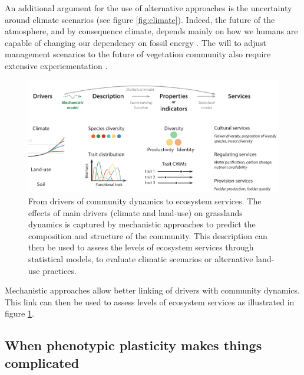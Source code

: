  An additional argument for the use of alternative approaches is the uncertainty around climate scenarios (see figure \ref{fig:climate}). Indeed, the future of the atmosphere, and by consequence climate, depends mainly on how we humans are capable of changing our dependency on fossil energy \parencite{intergovernmental_panel_on_climate_change_climate_2014}. The will to adjust management scenarios to the future of vegetation community \parencite{schirpe_multiple_2013} also require extensive experiementation \parencite{rodriguez_lingra-cc:_1999, martin_simulations_2012, deleglise_drought-induced_2015}.
 
 
 
\begin{figure}
    \includegraphics[width=1\linewidth]{./1_Introduction/graphics/drivers_to_services.pdf}
  \caption[From drivers to ecosystem services]{From drivers of community dynamics to ecosystem services. The effects of main drivers (climate and land-use) on grasslands dynamics is captured by mechanistic approaches to predict the composition and structure of the community. This description can then be used to assess the levels of ecosystem services through statistical models, to evaluate climatic scenarios or alternative land-use practices.}
  \label{fig:drivers2services}
\end{figure}

Mechanistic approaches allow better linking of drivers with community dynamics. This link can then be used to assess levels of ecosystem services as illustrated in figure \ref{fig:drivers2services}.




\subsection{When phenotypic plasticity makes things complicated}

